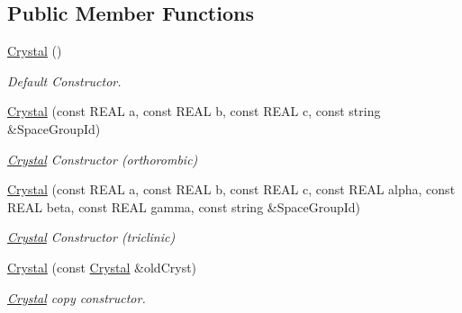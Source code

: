 \subsection*{Public Member Functions}
\begin{DoxyCompactItemize}
\item 
\mbox{\label{class_obj_cryst_1_1_crystal_a4d9c152db2dfcea3c849d0a7ae547a2e}} 
\mbox{\hyperlink{class_obj_cryst_1_1_crystal_a4d9c152db2dfcea3c849d0a7ae547a2e}{Crystal}} ()
\begin{DoxyCompactList}\small\item\em Default Constructor. \end{DoxyCompactList}\item 
\mbox{\hyperlink{class_obj_cryst_1_1_crystal_af4476f2fa29985667c19dc14dcc1efc9}{Crystal}} (const R\+E\+AL a, const R\+E\+AL b, const R\+E\+AL c, const string \&Space\+Group\+Id)
\begin{DoxyCompactList}\small\item\em \mbox{\hyperlink{class_obj_cryst_1_1_crystal}{Crystal}} Constructor (orthorombic) \end{DoxyCompactList}\item 
\mbox{\hyperlink{class_obj_cryst_1_1_crystal_a5bb224d9b91463fb5748d76a2bcd6949}{Crystal}} (const R\+E\+AL a, const R\+E\+AL b, const R\+E\+AL c, const R\+E\+AL alpha, const R\+E\+AL beta, const R\+E\+AL gamma, const string \&Space\+Group\+Id)
\begin{DoxyCompactList}\small\item\em \mbox{\hyperlink{class_obj_cryst_1_1_crystal}{Crystal}} Constructor (triclinic) \end{DoxyCompactList}\item 
\mbox{\label{class_obj_cryst_1_1_crystal_a4fd1bac8dbb8c119077f3b1f3d19153f}} 
\mbox{\hyperlink{class_obj_cryst_1_1_crystal_a4fd1bac8dbb8c119077f3b1f3d19153f}{Crystal}} (const \mbox{\hyperlink{class_obj_cryst_1_1_crystal}{Crystal}} \&old\+Cryst)
\begin{DoxyCompactList}\small\item\em \mbox{\hyperlink{class_obj_cryst_1_1_crystal}{Crystal}} copy constructor. \end{DoxyCompactList}\item 
\mbox{\label{class_obj_cryst_1_1_crystal_a13a9e007a57aeb11a5d808099c56c2b5}} 

\end{DoxyCompactItemize}
